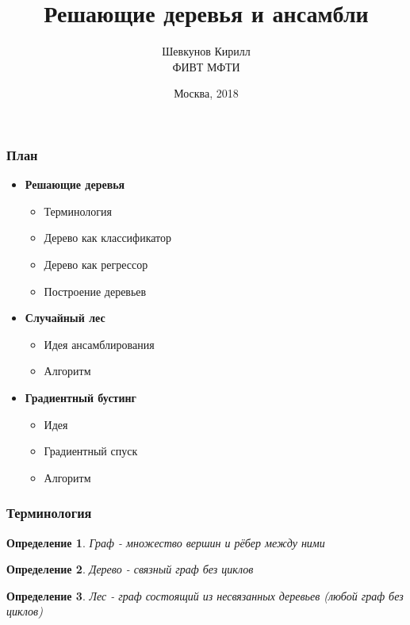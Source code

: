 \documentclass[14pt]{beamer}
\title{\small{Решающие деревья и ансамбли}}
\author{\small{%
	Шевкунов Кирилл
}\\%
\vspace{30pt}%
ФИВТ МФТИ
\vspace{20pt}%
}
\date{\small{Москва, 2018}}
\begin{document}
\newtheorem{rudef}{Определение}

\maketitle
\begin{frame}
\frametitle{План}
\begin{itemize}
  \item \textbf{Решающие деревья} 
	  \begin {itemize}
		\item Терминология
		\item Дерево как классификатор
		\item Дерево как регрессор
		\item Построение деревьев
	  \end {itemize}
  \item \textbf{Случайный лес} 
	  \begin {itemize}
		\item Идея ансамблирования
		\item Алгоритм
	  \end {itemize}
  \item \textbf{Градиентный бустинг} 
	  \begin {itemize}
		\item Идея
		\item Градиентный спуск
		\item Алгоритм
	  \end {itemize}
\end{itemize}
\end{frame} 

\begin{frame}
	\frametitle{Терминология}
	
	\begin{rudef}
        Граф - множество вершин и рёбер между ними
    \end{rudef}
    \pause
    
	\begin{rudef}
        Дерево - связный граф без циклов
    \end{rudef}
    \pause
    
 	\begin{rudef}
        Лес - граф состоящий из несвязанных деревьев (любой граф без циклов)
    \end{rudef}
\end{frame}
\end{document}
